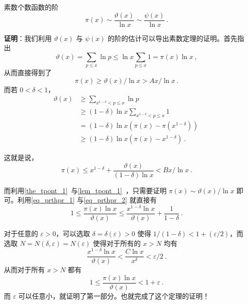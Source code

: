 

\begin{theorem}{素数个数函数的阶}
\begin{equation}
\pi(x) \sim \frac{\vartheta(x)}{\ln x} \sim \frac{\psi(x)}{\ln x} ~.
\end{equation}

\end{theorem}
\textbf{证明}：我们利用 $\vartheta(x)$ 与 $\psi(x)$ 的阶的估计可以导出素数定理的证明。首先指出
\begin{equation}
\vartheta(x) = \sum_{p \le x} \ln p \le \ln x \sum_{p \le x} 1 = \pi(x) \ln x ~,
\end{equation}
从而直接得到了
\begin{equation}\label{eq_prthpr_1}
\pi(x) \ge \vartheta(x)/\ln x > Ax / \ln x ~.
\end{equation}
而若 $0 < \delta < 1$，
\begin{equation}
\begin{aligned}
\vartheta(x) &\ge \sum_{x^{1-\delta} < p \le x} \ln p ~\\
&\ge (1-\delta) \ln x \sum_{x^{1-\delta} < p \le x} 1 ~\\
&= (1-\delta) \ln x \left( \pi(x) - \pi(x^{1-\delta}) \right) ~\\
&\ge (1-\delta) \ln x \left( \pi(x) - x^{1-\delta} \right) ~.
\end{aligned}
\end{equation}

这就是说，
\begin{equation}\label{eq_prthpr_2}
\pi(x) \le x^{1-\delta} + \frac{\vartheta(x)}{(1-\delta) \ln x} < Bx/\ln x ~.
\end{equation}

而利用\autoref{the_tpont_1}~与\autoref{lem_tpont_1}~，只需要证明 $\pi(x) \sim \vartheta(x)/\ln x$ 即可。利用\autoref{eq_prthpr_1} 与\autoref{eq_prthpr_2} 就直接有
\begin{equation}
1 \le \frac{\pi(x) \ln x}{\vartheta(x)} \le \frac{x^{1-\delta} \ln x}{\vartheta(x)} + \frac{1}{1-\delta} ~.
\end{equation}

对于任意的 $\varepsilon > 0$，可以选取 $\delta = \delta(\varepsilon) > 0$ 使得 $1/(1-\delta) < 1+ (\varepsilon/2)$，而选取 $N = N(\delta, \varepsilon) = N(\varepsilon)$ 使得对于所有的 $x > N$ 均有
\begin{equation}
\frac{x^{1-\delta}\ln x}{\vartheta(x)} < \frac{C \ln x}{x^\delta} < \varepsilon/2 ~.
\end{equation}
从而对于所有 $x>N$ 都有
\begin{equation}
1 \le \frac{\pi(x) \ln x}{\vartheta(x)} < 1+ \varepsilon ~.
\end{equation}
而 $\varepsilon$ 可以任意小，就证明了第一部分。也就完成了这个定理的证明！

